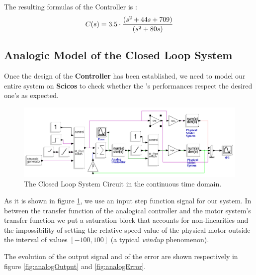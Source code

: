 The resulting formulas of the Controller is :
\[
		C(s) =3.5\cdot{} {{(s^2 + 44s + 709)} \over {(s^2+80s)}}
\]

\subsection{Analogic Model of the Closed Loop System}

Once the design of the \textbf{Controller} has been established, we need to model our entire system on \textbf{Scicos} to check whether the \CL{}'s performances respect the desired one's as expected.

\begin{figure}[H]
  \begin{center}
  \includegraphics[scale=0.50, angle=90]{FIGURES_2/ScicosAnalogCircuit.png} %
    \caption[Continuous time model]{The Closed Loop System Circuit in the continuous time domain.}
    \label{fig:CT_model}
  \end{center}
\end{figure}

As it is shown in figure \ref{fig:CT_model}, we use an input step function signal for our system. In between the transfer function of the analogical controller and the motor system's transfer function we put a saturation block that accounts for non-linearities and the impossibility of setting the relative speed value of the physical motor outside the interval of values $[-100,100]$ (a typical \emph{windup} phenomenon).

The evolution of the output signal and of the error are shown respectively in figure \ref{fig:analogOutput} and \ref{fig:analogError}.

